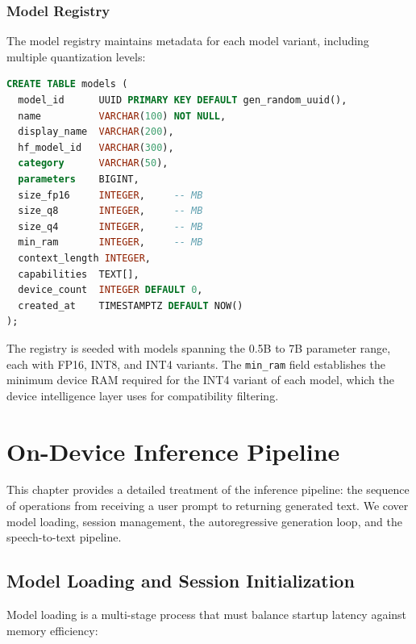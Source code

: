 \documentclass[12pt, letterpaper, twoside]{report}
\begin{document}
\subsection{Model Registry}
\label{subsec:model_registry}

The model registry maintains metadata for each model variant, including multiple quantization levels:

\begin{lstlisting}[language=SQL, caption={Model registry schema (abbreviated)}]
CREATE TABLE models (
  model_id      UUID PRIMARY KEY DEFAULT gen_random_uuid(),
  name          VARCHAR(100) NOT NULL,
  display_name  VARCHAR(200),
  hf_model_id   VARCHAR(300),
  category      VARCHAR(50),
  parameters    BIGINT,
  size_fp16     INTEGER,     -- MB
  size_q8       INTEGER,     -- MB
  size_q4       INTEGER,     -- MB
  min_ram       INTEGER,     -- MB
  context_length INTEGER,
  capabilities  TEXT[],
  device_count  INTEGER DEFAULT 0,
  created_at    TIMESTAMPTZ DEFAULT NOW()
);
\end{lstlisting}

The registry is seeded with models spanning the 0.5B to 7B parameter range, each with FP16, INT8, and INT4 variants. The \texttt{min\_ram} field establishes the minimum device RAM required for the INT4 variant of each model, which the device intelligence layer uses for compatibility filtering.

\chapter{On-Device Inference Pipeline}
\label{ch:inference}

This chapter provides a detailed treatment of the inference pipeline: the sequence of operations from receiving a user prompt to returning generated text. We cover model loading, session management, the autoregressive generation loop, and the speech-to-text pipeline.

\section{Model Loading and Session Initialization}
\label{sec:model_loading}

Model loading is a multi-stage process that must balance startup latency against memory efficiency:
\end{document}
